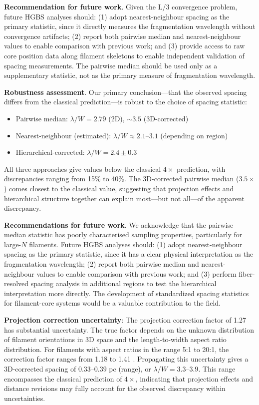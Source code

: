 \documentclass[twoside,twocolumn]{mnras}
\begin{document}
\textbf{Recommendation for future work}. Given the L/3 convergence problem, future HGBS analyses should: (1) adopt nearest-neighbour spacing as the primary statistic, since it directly measures the fragmentation wavelength without convergence artifacts; (2) report both pairwise median and nearest-neighbour values to enable comparison with previous work; and (3) provide access to raw core position data along filament skeletons to enable independent validation of spacing measurements. The pairwise median should be used only as a supplementary statistic, not as the primary measure of fragmentation wavelength.

\textbf{Robustness assessment}. Our primary conclusion—that the observed spacing differs from the classical prediction—is robust to the choice of spacing statistic:
\begin{itemize}
    \item Pairwise median: $\lambda/W = 2.79$ (2D), $\sim 3.5$ (3D-corrected)
    \item Nearest-neighbour (estimated): $\lambda/W \approx 2.1$--$3.1$ (depending on region)
    \item Hierarchical-corrected: $\lambda/W = 2.4 \pm 0.3$
\end{itemize}
All three approaches give values below the classical $4\times$ prediction, with discrepancies ranging from 15\% to 40\%. The 3D-corrected pairwise median ($3.5\times$) comes closest to the classical value, suggesting that projection effects and hierarchical structure together can explain most—but not all—of the apparent discrepancy.

\textbf{Recommendations for future work}. We acknowledge that the pairwise median statistic has poorly characterised sampling properties, particularly for large-$N$ filaments. Future HGBS analyses should: (1) adopt nearest-neighbour spacing as the primary statistic, since it has a clear physical interpretation as the fragmentation wavelength; (2) report both pairwise median and nearest-neighbour values to enable comparison with previous work; and (3) perform fiber-resolved spacing analysis in additional regions to test the hierarchical interpretation more directly. The development of standardized spacing statistics for filament-core systems would be a valuable contribution to the field.

\textbf{Projection correction uncertainty}: The projection correction factor of 1.27 has substantial uncertainty. The true factor depends on the unknown distribution of filament orientations in 3D space and the length-to-width aspect ratio distribution. For filaments with aspect ratios in the range 5:1 to 20:1, the correction factor ranges from 1.18 to 1.41 \citep{Hacar2013}. Propagating this uncertainty gives a 3D-corrected spacing of $0.33$--$0.39$ pc (range), or $\lambda/W = 3.3$--$3.9$. This range encompasses the classical prediction of $4\times$, indicating that projection effects and distance revisions may fully account for the observed discrepancy within uncertainties.
\end{document}
